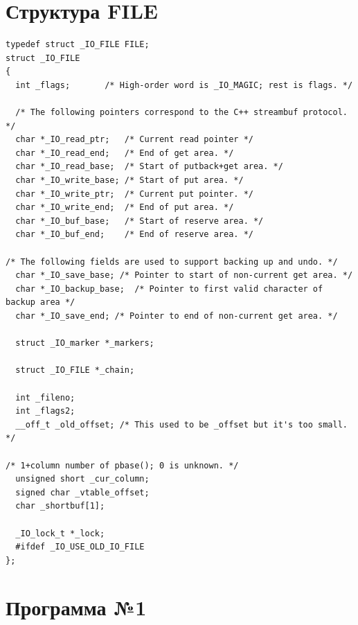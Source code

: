 \section*{Структура FILE}

\begin{lstlisting}
typedef struct _IO_FILE FILE;
struct _IO_FILE
{
  int _flags;		/* High-order word is _IO_MAGIC; rest is flags. */

  /* The following pointers correspond to the C++ streambuf protocol. */
  char *_IO_read_ptr;	/* Current read pointer */
  char *_IO_read_end;	/* End of get area. */
  char *_IO_read_base;	/* Start of putback+get area. */
  char *_IO_write_base;	/* Start of put area. */
  char *_IO_write_ptr;	/* Current put pointer. */
  char *_IO_write_end;	/* End of put area. */
  char *_IO_buf_base;	/* Start of reserve area. */
  char *_IO_buf_end;	/* End of reserve area. */

/* The following fields are used to support backing up and undo. */
  char *_IO_save_base; /* Pointer to start of non-current get area. */
  char *_IO_backup_base;  /* Pointer to first valid character of backup area */
  char *_IO_save_end; /* Pointer to end of non-current get area. */

  struct _IO_marker *_markers;

  struct _IO_FILE *_chain;

  int _fileno;
  int _flags2;
  __off_t _old_offset; /* This used to be _offset but it's too small.  */

/* 1+column number of pbase(); 0 is unknown. */
  unsigned short _cur_column;
  signed char _vtable_offset;
  char _shortbuf[1];

  _IO_lock_t *_lock;
  #ifdef _IO_USE_OLD_IO_FILE
};
\end{lstlisting}

\section*{Программа №1}

